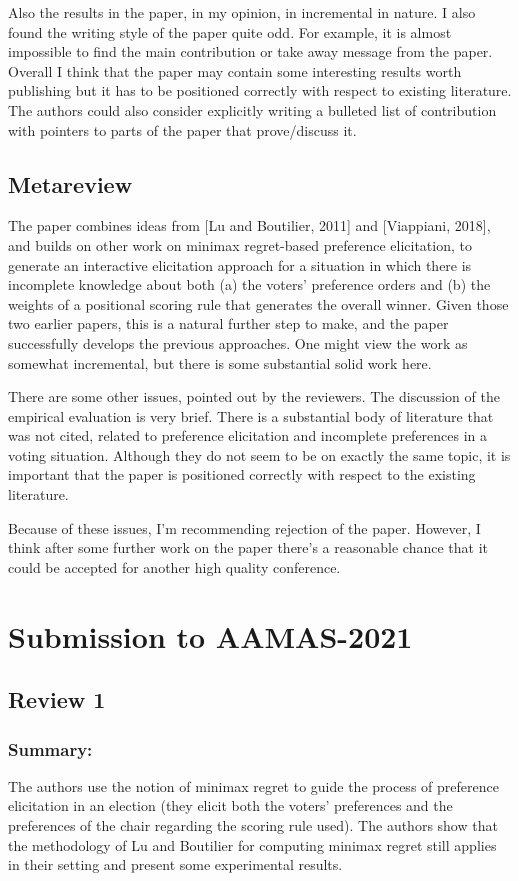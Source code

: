 \documentclass[version=3.21, pagesize, twoside=off, bibliography=totoc, DIV=calc, fontsize=12pt, a4paper]{scrartcl}
\begin{document}
Also the results in the paper, in my opinion, in incremental in nature. I also found the writing style of the paper quite odd. For example, it is almost impossible to find the main contribution or take away message from the paper. Overall I think that the paper may contain some interesting results worth publishing but it has to be positioned correctly with respect to existing literature. The authors could also consider explicitly writing a bulleted list of contribution with pointers to parts of the paper that prove/discuss it.

\subsection{Metareview}
The paper combines ideas from [Lu and Boutilier, 2011] and [Viappiani, 2018], and builds on other work on minimax regret-based preference elicitation, to generate an interactive elicitation approach for a situation in which there is incomplete knowledge about both (a) the voters' preference orders and (b) the weights of a positional scoring rule that generates the overall winner. Given those two earlier papers, this is a natural further step to make, and the paper successfully develops the previous approaches. One might view the work as somewhat incremental, but there is some substantial solid work here.

There are some other issues, pointed out by the reviewers. The discussion of the empirical evaluation is very brief. There is a substantial body of literature that was not cited, related to preference elicitation and incomplete preferences in a voting situation. Although they do not seem to be on exactly the same topic, it is important that the paper is positioned correctly with respect to the existing literature.

Because of these issues, I'm recommending rejection of the paper. However, I think after some further work on the paper there's a reasonable chance that it could be accepted for another high quality conference.

\section{Submission to AAMAS-2021} 
\label{sec:reviews-aamas}
\subsection{Review 1}
\subsubsection*{Summary:}	The authors use the notion of minimax regret to guide the process of preference elicitation in an election (they elicit both the voters' preferences and the preferences of the chair regarding the scoring rule used). The authors show that the methodology of Lu and Boutilier for computing minimax regret still applies in their setting and present some experimental results.
\end{document}
